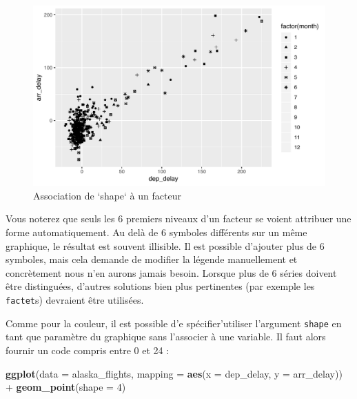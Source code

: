 \documentclass[a4paperpaper,]{article}
\newenvironment{Shaded}{\begin{snugshade}}{\end{snugshade}}
\newcommand{\DataTypeTok}[1]{\textcolor[rgb]{0.00,0.34,0.68}{#1}}
\newcommand{\DecValTok}[1]{\textcolor[rgb]{0.69,0.50,0.00}{#1}}
\newcommand{\KeywordTok}[1]{\textcolor[rgb]{0.12,0.11,0.11}{\textbf{#1}}}
\newcommand{\NormalTok}[1]{\textcolor[rgb]{0.12,0.11,0.11}{#1}}
\newcommand{\OperatorTok}[1]{\textcolor[rgb]{0.12,0.11,0.11}{#1}}
\newcommand{\StringTok}[1]{\textcolor[rgb]{0.75,0.01,0.01}{#1}}
\theoremstyle{definition}
\theoremstyle{definition}
\theoremstyle{definition}
\theoremstyle{remark}
\begin{document}
\begin{figure}[htpb]

{\centering \includegraphics[width=0.9\linewidth]{figure/shapeplot-1} 

}

\caption{Association de `shape` à un facteur}\label{fig:shapeplot}
\end{figure}

Vous noterez que seuls les 6 premiers niveaux d'un facteur se voient
attribuer une forme automatiquement. Au delà de 6 symboles différents
sur un même graphique, le résultat est souvent illisible. Il est
possible d'ajouter plus de 6 symboles, mais cela demande de modifier la
légende manuellement et concrètement nous n'en aurons jamais besoin.
Lorsque plus de 6 séries doivent être distinguées, d'autres solutions
bien plus pertinentes (par exemple les \texttt{factet}s) devraient être
utilisées.

Comme pour la couleur, il est possible d'e spécifier'utiliser l'argument
\texttt{shape} en tant que paramètre du graphique sans l'associer à une
variable. Il faut alors fournir un code compris entre 0 et 24 :

\begin{Shaded}
\begin{Highlighting}[]
\KeywordTok{ggplot}\NormalTok{(}\DataTypeTok{data =}\NormalTok{ alaska_flights, }\DataTypeTok{mapping =} \KeywordTok{aes}\NormalTok{(}\DataTypeTok{x =}\NormalTok{ dep_delay, }\DataTypeTok{y =}\NormalTok{ arr_delay)) }\OperatorTok{+}
\StringTok{  }\KeywordTok{geom_point}\NormalTok{(}\DataTypeTok{shape =} \DecValTok{4}\NormalTok{)}
\end{Highlighting}
\end{Shaded}
\end{document}
